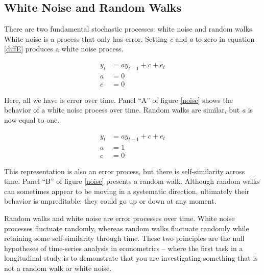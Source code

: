 \documentclass[english,,man]{apa6}
\theoremstyle{definition}
\theoremstyle{definition}
\theoremstyle{definition}
\theoremstyle{remark}
\begin{document}
\hypertarget{white-noise-and-random-walks}{%
\subsection{White Noise and Random
Walks}\label{white-noise-and-random-walks}}

There are two fundamental stochastic processes: white noise and random
walks. White noise is a process that only has error. Setting \emph{c}
and \emph{a} to zero in equation \ref{diffE} produces a white noise
process.

\begin{equation}
\begin{split}
\label{whitenoise}
y_{t} &= a y_{t-1} + c + e_{t} \\
a &= 0 \\
c &= 0
\end{split}
\end{equation}

\noindent Here, all we have is error over time. Panel \enquote{A} of
figure \ref{noise} shows the behavior of a white noise process over
time. Random walks are similar, but \emph{a} is now equal to one.

\begin{equation}
\begin{split}
\label{rw}
y_{t} &= a y_{t-1} + c + e_{t} \\ 
a &= 1 \\ 
c &= 0
\end{split}
\end{equation}

\noindent This representation is also an error process, but there is
self-similarity across time. Panel \enquote{B} of figure \ref{noise}
presents a random walk. Although random walks can sometimes appear to be
moving in a systematic direction, ultimately their behavior is
unpreditable: they could go up or down at any moment.

Random walks and white noise are error processes over time. White noise
processes fluctuate randomly, whereas random walks fluctuate randomly
while retaining some self-similarity through time. These two principles
are the null hypotheses of time-series analysis in econometrics -- where
the first task in a longitudinal study is to demonstrate that you are
investigating something that is not a random walk or white noise.
\end{document}
